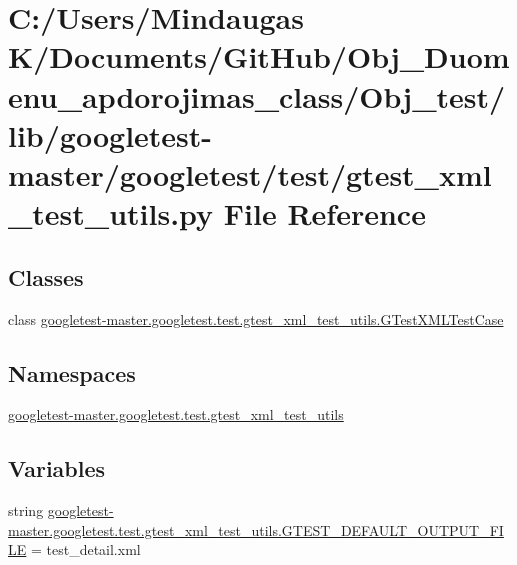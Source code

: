 \hypertarget{_obj__test_2lib_2googletest-master_2googletest_2test_2gtest__xml__test__utils_8py}{}\section{C\+:/\+Users/\+Mindaugas K/\+Documents/\+Git\+Hub/\+Obj\+\_\+\+Duomenu\+\_\+apdorojimas\+\_\+class/\+Obj\+\_\+test/lib/googletest-\/master/googletest/test/gtest\+\_\+xml\+\_\+test\+\_\+utils.py File Reference}
\label{_obj__test_2lib_2googletest-master_2googletest_2test_2gtest__xml__test__utils_8py}
\subsection*{Classes}
\begin{DoxyCompactItemize}
\item 
class \mbox{\hyperlink{classgoogletest-master_1_1googletest_1_1test_1_1gtest__xml__test__utils_1_1_g_test_x_m_l_test_case}{googletest-\/master.\+googletest.\+test.\+gtest\+\_\+xml\+\_\+test\+\_\+utils.\+G\+Test\+X\+M\+L\+Test\+Case}}
\end{DoxyCompactItemize}
\subsection*{Namespaces}
\begin{DoxyCompactItemize}
\item 
 \mbox{\hyperlink{namespacegoogletest-master_1_1googletest_1_1test_1_1gtest__xml__test__utils}{googletest-\/master.\+googletest.\+test.\+gtest\+\_\+xml\+\_\+test\+\_\+utils}}
\end{DoxyCompactItemize}
\subsection*{Variables}
\begin{DoxyCompactItemize}
\item 
string \mbox{\hyperlink{namespacegoogletest-master_1_1googletest_1_1test_1_1gtest__xml__test__utils_a0717f0f39ae3081e8a64864e2bec4773}{googletest-\/master.\+googletest.\+test.\+gtest\+\_\+xml\+\_\+test\+\_\+utils.\+G\+T\+E\+S\+T\+\_\+\+D\+E\+F\+A\+U\+L\+T\+\_\+\+O\+U\+T\+P\+U\+T\+\_\+\+F\+I\+LE}} = \textquotesingle{}test\+\_\+detail.\+xml\textquotesingle{}
\end{DoxyCompactItemize}
